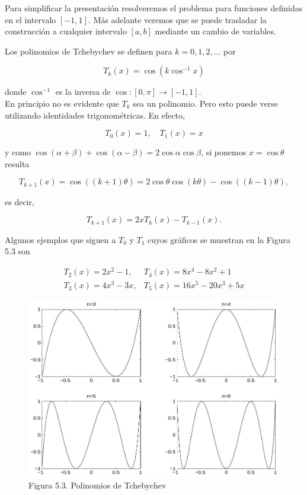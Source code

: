 \documentclass[10pt]{article}
\begin{document}
Para simplificar la presentación resolveremos el problema para funciones definidas en el intervalo $[-1,1]$. Más adelante veremos que se puede trasladar la construcción a cualquier intervalo $[a, b]$ mediante un cambio de variables.

Los polinomios de Tchebychev se definen para $k=0,1,2, \ldots$ por

$$
T_{k}(x)=\cos \left(k \cos ^{-1} x\right)
$$

donde $\cos ^{-1}$ es la inversa de $\cos :[0, \pi] \rightarrow[-1,1]$.\\
En principio no es evidente que $T_{k}$ sea un polinomio. Pero esto puede verse utilizando identidades trigonométricas. En efecto,

$$
T_{0}(x)=1, \quad T_{1}(x)=x
$$

y como $\cos (\alpha+\beta)+\cos (\alpha-\beta)=2 \cos \alpha \cos \beta$, si ponemos $x=\cos \theta$ resulta

$$
T_{k+1}(x)=\cos ((k+1) \theta)=2 \cos \theta \cos (k \theta)-\cos ((k-1) \theta),
$$

es decir,


\begin{equation*}
T_{k+1}(x)=2 x T_{k}(x)-T_{k-1}(x) . \tag{5.5}
\end{equation*}


Algunos ejemplos que siguen a $T_{0}$ y $T_{1}$ cuyos gráficos se muestran en la Figura 5.3 son

$$
\begin{array}{ll}
T_{2}(x)=2 x^{2}-1, & T_{4}(x)=8 x^{4}-8 x^{2}+1 \\
T_{3}(x)=4 x^{3}-3 x, & T_{5}(x)=16 x^{5}-20 x^{3}+5 x
\end{array}
$$

\begin{figure}[h]
\begin{center}
  \includegraphics[width=\textwidth]{2025_09_05_3888c9ac96bd653d96b4g-102}
\captionsetup{labelformat=empty}
\caption{Figura 5.3. Polinomios de Tchebychev}
\end{center}
\end{figure}
\end{document}

